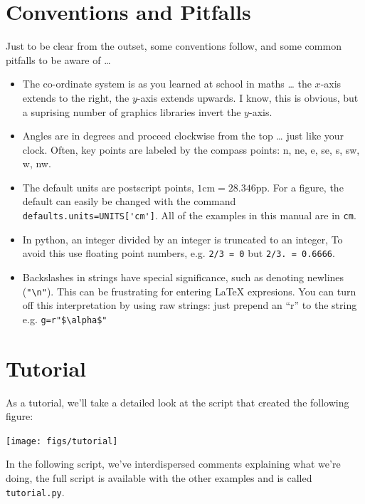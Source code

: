\documentclass[a4paper]{book}
\begin{document}
\section{Conventions and Pitfalls}
\label{sec:conventions}

Just to be clear from the outset, some conventions follow, and some common
pitfalls to be aware of \ldots

\begin{itemize}
\item The co-ordinate system is as you learned at school in maths \ldots
  the $x$-axis extends to the right, the $y$-axis extends upwards. I know, 
  this is obvious, but a suprising number of graphics libraries invert the 
  $y$-axis.
\item Angles are in degrees and proceed clockwise from the top \ldots
  just like your clock.  Often, key points are labeled by the compass
  points: n, ne, e, se, s, sw, w, nw.
\item The default units are postscript points,
  $1\mathrm{cm}=28.346\mathrm{pp}$. For a figure, the default can
  easily be changed with the command
  \Verb|defaults.units=UNITS['cm']|. All of the examples in this manual are
  in \texttt{cm}.
\item In python, an integer divided by an integer is truncated to an
  integer, To avoid this use floating point numbers, e.g. \Verb|2/3 = 0|
  but \Verb|2/3. = 0.6666|.
\item Backslashes in strings have special significance, such as
  denoting newlines (\Verb|"\n"|). This can be frustrating for
  entering \LaTeX{} expresions. You can turn off this interpretation by
  using raw strings: just prepend an ``r'' to the string e.g.
  \Verb|g=r"$\alpha$"|
\end{itemize}


\section{Tutorial}
\label{sec:tutotial}

As a tutorial, we'll take a detailed look at the script that created the
following figure:
\begin{center}
  \texttt{[image: figs/tutorial]}
\end{center}
In the following script, we've interdispersed 
comments explaining what we're doing, the full script is available
with the other examples and is called \texttt{tutorial.py}.
\end{document}
